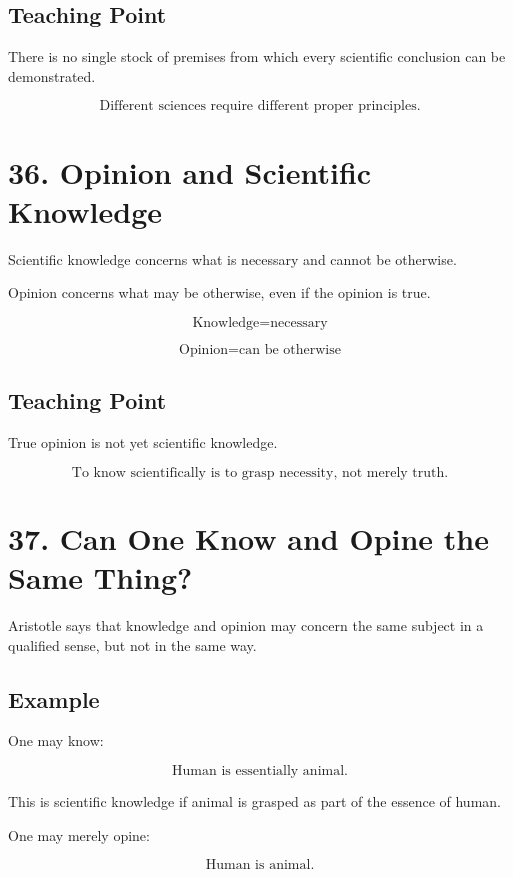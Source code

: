 \documentclass[12pt]{article}
\begin{document}
\subsection*{Teaching Point}

There is no single stock of premises from which every scientific conclusion can
be demonstrated.

\[
\boxed{
\text{Different sciences require different proper principles.}
}
\]

\section*{36. Opinion and Scientific Knowledge}

Scientific knowledge concerns what is necessary and cannot be otherwise.

Opinion concerns what may be otherwise, even if the opinion is true.

\[
\text{Knowledge} = \text{necessary}
\]

\[
\text{Opinion} = \text{can be otherwise}
\]

\subsection*{Teaching Point}

True opinion is not yet scientific knowledge.

\[
\boxed{
\text{To know scientifically is to grasp necessity, not merely truth.}
}
\]

\section*{37. Can One Know and Opine the Same Thing?}

Aristotle says that knowledge and opinion may concern the same subject in a
qualified sense, but not in the same way.

\subsection*{Example}

One may know:

\[
\text{Human is essentially animal.}
\]

This is scientific knowledge if animal is grasped as part of the essence of
human.

One may merely opine:

\[
\text{Human is animal.}
\]
\end{document}
